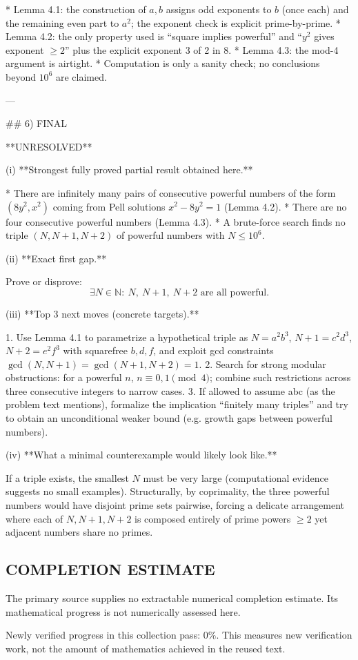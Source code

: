* Lemma 4.1: the construction of \(a,b\) assigns odd exponents to \(b\) (once each) and the remaining
  even part to \(a^2\); the exponent check is explicit prime-by-prime.
* Lemma 4.2: the only property used is “square implies powerful” and “\(y^2\) gives exponent \(\ge 2\)”
  plus the explicit exponent 3 of 2 in 8.
* Lemma 4.3: the mod-4 argument is airtight.
* Computation is only a sanity check; no conclusions beyond \(10^6\) are claimed.

---

## 6) FINAL

**UNRESOLVED**

(i) **Strongest fully proved partial result obtained here.**

* There are infinitely many pairs of consecutive powerful numbers of the form \((8y^2, x^2)\) coming
  from Pell solutions \(x^2-8y^2=1\) (Lemma 4.2).
* There are no four consecutive powerful numbers (Lemma 4.3).
* A brute-force search finds no triple \((N,N+1,N+2)\) of powerful numbers with \(N\le 10^6\).

(ii) **Exact first gap.**

Prove or disprove:
\[
\exists N\in\mathbb N:\ N,\ N+1,\ N+2\text{ are all powerful}.
\]

(iii) **Top 3 next moves (concrete targets).**

1. Use Lemma 4.1 to parametrize a hypothetical triple as
   \(N=a^2b^3\), \(N+1=c^2d^3\), \(N+2=e^2f^3\) with squarefree \(b,d,f\), and exploit gcd constraints
   \(\gcd(N,N+1)=\gcd(N+1,N+2)=1\).
2. Search for strong modular obstructions: for a powerful \(n\), \(n\equiv 0,1\pmod 4\); combine such
   restrictions across three consecutive integers to narrow cases.
3. If allowed to assume abc (as the problem text mentions), formalize the implication “finitely many
   triples” and try to obtain an unconditional weaker bound (e.g. growth gaps between powerful numbers).

(iv) **What a minimal counterexample would likely look like.**

If a triple exists, the smallest \(N\) must be very large (computational evidence suggests no small
examples). Structurally, by coprimality, the three powerful numbers would have disjoint prime sets
pairwise, forcing a delicate arrangement where each of \(N, N+1, N+2\) is composed entirely of prime
powers \(\ge 2\) yet adjacent numbers share no primes.




\subsection*{COMPLETION ESTIMATE}
The primary source supplies no extractable numerical completion estimate. Its mathematical progress is not numerically assessed here.

Newly verified progress in this collection pass: $0\%$. This measures new verification work, not the amount of mathematics achieved in the reused text.
